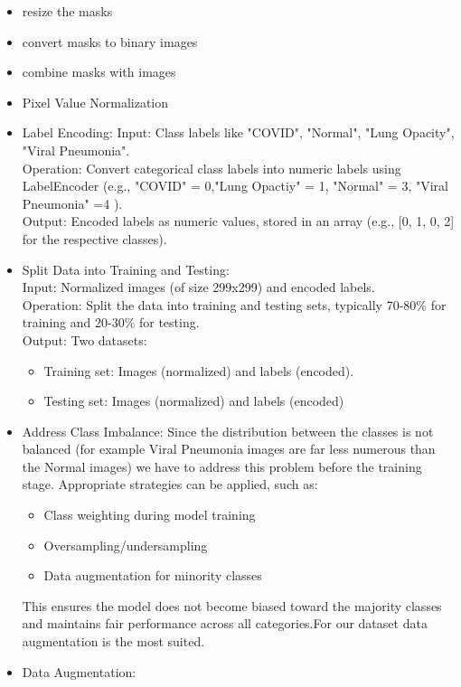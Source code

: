 \documentclass{article}
\begin{document}
\begin{itemize}
    \item resize the masks 
    \item convert masks to binary images
    \item combine masks with images
    \item Pixel Value Normalization
    \item Label Encoding: 
    Input: Class labels like "COVID", "Normal", "Lung Opacity", "Viral Pneumonia".\\
    Operation: Convert categorical class labels into numeric labels using LabelEncoder (e.g., "COVID" = 0,"Lung Opactiy" = 1, "Normal" = 3, "Viral Pneumonia" =4 ).\\
    Output: Encoded labels as numeric values, stored in an array (e.g., [0, 1, 0, 2] for the respective classes).\\
    \item Split Data into Training and Testing:\\
    Input: Normalized images (of size 299x299) and encoded labels.\\
    Operation: Split the data into training and testing sets, typically 70-80\% for training and 20-30\% for testing.\\
    Output: Two datasets:\\
	  \begin{itemize}
            \item Training set: Images (normalized) and labels (encoded).
            \item Testing set: Images (normalized) and labels (encoded)
        \end{itemize}
    \item Address Class Imbalance: Since the distribution between the classes is not balanced (for example Viral Pneumonia images are far less numerous than the Normal images) we have to address this problem before the training stage. Appropriate strategies can be applied, such as:
    \begin{itemize}
        \item Class weighting during model training
        \item Oversampling/undersampling
        \item Data augmentation for minority classes
    \end{itemize}
    This ensures the model does not become biased toward the majority classes and maintains fair performance across all categories.For our dataset data augmentation is the most suited.
    \item Data Augmentation:

\end{itemize}
\end{document}
